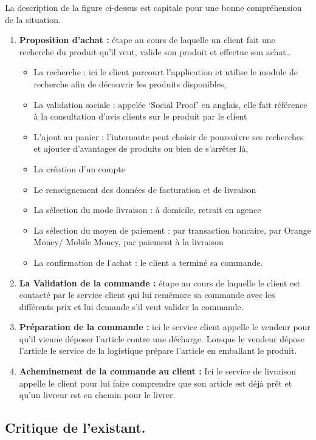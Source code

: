 La description de la figure ci-dessus est capitale pour une bonne compréhension de la situation.
\begin{enumerate}
	\item  \textbf{Proposition d'achat :} étape au cours de laquelle un client fait une recherche du produit qu’il veut, valide son produit et effectue son achat..
	\begin{itemize}[label=\textbullet, font=\LARGE \color{blue}]
		\item La recherche : ici le client parcourt l’application et utilise le module de recherche afin de découvrir les produits disponibles,
		\item La validation sociale : appelée ‘Social Proof’ en anglais, elle fait référence à la consultation d’avis clients sur le produit par le client	
		\item L’ajout au panier : l’internaute peut choisir de poursuivre ses recherches et ajouter d’avantages de produits ou bien de s’arrêter là,
		\item La création d’un compte 
		\item Le renseignement des données de facturation et de livraison 
		\item La sélection du mode livraison : à domicile, retrait en agence
		\item La sélection du moyen de paiement : par transaction bancaire, par Orange Money/ Mobile Money, par paiement à la livraison 
		\item La confirmation de l’achat : le client a terminé sa commande.
	\end{itemize}
	\item  \textbf{La Validation de la commande :} étape au cours de laquelle le client est contacté par le service client qui lui remémore sa commande avec les différents prix et lui demande s’il veut valider la commande.
	\item  \textbf{Préparation de la commande :} ici le service client appelle le vendeur pour qu’il vienne déposer l’article contre une décharge. Lorsque le vendeur dépose l’article le service de la logistique prépare l’article en emballant le produit.
	\item  \textbf{Acheminement de la commande au client  :} Ici le service de livraison appelle le client pour lui faire comprendre que son article est déjà prêt et qu’un livreur est en chemin pour le livrer.
\end{enumerate}

\subsection{Critique de l'existant.}

